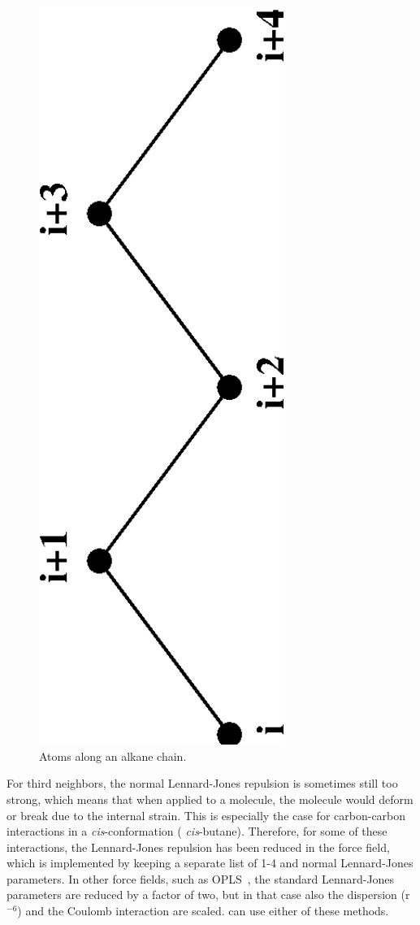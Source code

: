 \begin{figure}
\centerline{\includegraphics[width=8cm]{plots/chain}}
\caption{Atoms along an alkane chain.}
\label{fig:chain}
\end{figure}

For third neighbors, the normal Lennard-Jones repulsion is sometimes
still too strong, which means that when applied to a molecule, the
molecule would deform or break due to the internal strain. This is
especially the case for carbon-carbon interactions in a {\em
cis}-conformation ({\eg} {\em cis}-butane).  Therefore, for some of these
interactions, the Lennard-Jones repulsion has been reduced in the
{\gromos} force field, which is implemented by keeping a separate list of
1-4 and normal Lennard-Jones parameters. In other force fields, such
as OPLS~\cite{Jorgensen88}, the standard Lennard-Jones parameters are reduced
by a factor of two, but in that case also the dispersion (r$^{-6}$)
and the Coulomb interaction are scaled.
{\gromacs} can use either of these methods.

